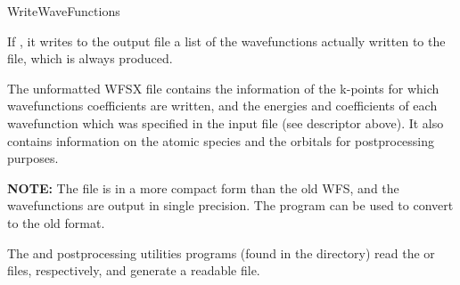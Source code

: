   
  \begin{fdflogicalF}{WriteWaveFunctions}
  
    If \fdftrue, it writes to the output file a list of the
    wavefunctions actually written to the  file,
    which is always produced.
  
  \end{fdflogicalF}
  
  The unformatted WFSX file contains the information of the
  k-points for which wavefunctions coefficients are written, and the
  energies and coefficients of each wavefunction which was specified in
  the input file (see  descriptor above). It also contains information
  on the atomic species and the orbitals for postprocessing purposes.
  
  \textbf{NOTE:} The  file is in a more compact
  form than the old WFS, and the wavefunctions are output in single
  precision. The  program can be used to
  convert to the old format.
  
  \noindent
  The  and
   postprocessing utilities programs
  (found in the  directory) read the  or
   files, respectively, and generate a readable file.